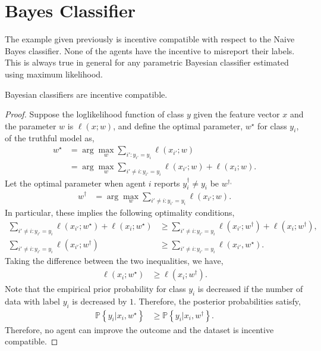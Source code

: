 \documentclass{article}
\begin{document}
\section{Bayes Classifier} 
The example given previously is incentive compatible with respect to the Naive Bayes classifier. None of the agents have the incentive to misreport their labels. This is always true in general for any parametric Bayesian classifier estimated using maximum likelihood.
\newline \newline
\begin{prop} \label{prop:bc} 
Bayesian classifiers are incentive compatible.
\end{prop}
\begin{proof} \label{proof:bcpf} 
Suppose the loglikelihood function of class $y $ given the feature vector $x $ and the parameter $w $ is $\ell\left(x ; w \right)$, and define the optimal parameter, $w^\star $ for class $y_{i}$, of the truthful model as,
\begin{align*}
w^\star  &= \arg\displaystyle\max_{w} \displaystyle\sum_{i' : y_{i'} = y_{i}} \ell\left(x_{i'} ; w\right)
\\ &= \arg\displaystyle\max_{w} \displaystyle\sum_{i' \neq  i : y_{i'} = y_{i}} \ell\left(x_{i'} ; w\right) + \ell\left(x_{i} ; w\right).
\end{align*}
Let the optimal parameter when agent $i $ reports $y^{\dagger}_{i} \neq  y_{i}$ be $w^{\dagger,}$
\begin{align*}
w^{\dagger} &= \arg\displaystyle\max_{w} \displaystyle\sum_{i' \neq  i: y_{i'} = y_{i}} \ell\left(x_{i'} ; w\right).
\end{align*}
In particular, these implies the following optimality conditions,
\begin{align*}
\displaystyle\sum_{i' \neq  i : y_{i'} = y_{i}} \ell\left(x_{i'} ; w^\star \right) + \ell\left(x_{i} ; w^\star \right) &\geq  \displaystyle\sum_{i' \neq  i : y_{i'} = y_{i}} \ell\left(x_{i'} ; w^{\dagger}\right) + \ell\left(x_{i} ; w^{\dagger}\right),
\\ \displaystyle\sum_{i' \neq  i: y_{i'} = y_{i}} \ell\left(x_{i'} ; w^{\dagger}\right) &\geq  \displaystyle\sum_{i' \neq  i: y_{i'} = y_{i}} \ell\left(x_{i'}, w^\star \right).
\end{align*}
Taking the difference between the two inequalities, we have,
\begin{align*}
\ell\left(x_{i} ; w^\star \right) &\geq  \ell\left(x_{i} ; w^{\dagger}\right).
\end{align*}
Note that the empirical prior probability for class $y_{i}$ is decreased if the number of data with label $y_{i}$ is decreased by $1$. Therefore, the posterior probabilities satisfy,
\begin{align*}
\mathbb{P}\left\{y_{i} | x_{i}, w^\star \right\} &\geq  \mathbb{P}\left\{y_{i} | x_{i}, w^{\dagger}\right\}.
\end{align*}
Therefore, no agent can improve the outcome and the dataset is incentive compatible.
\newline \newline\end{proof}


\end{document}
